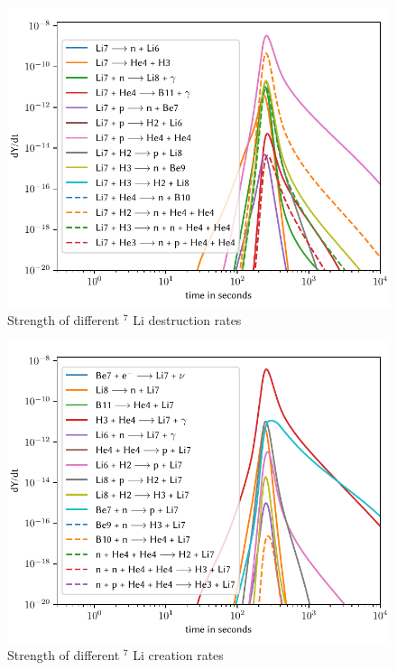 \begin{figure}[ht]
    \includegraphics[width=5.1in]{figures/app/Li7destruct.pdf}
    \caption{Strength of different ${}^7$ Li destruction rates}
    \label{fig:Li7destruct}
\end{figure}

\begin{figure}[ht]
    \includegraphics[width=5.1in]{figures/app/Li7create.pdf}
    \caption{Strength of different ${}^7$ Li creation rates}
    \label{fig:Li7create}
\end{figure}